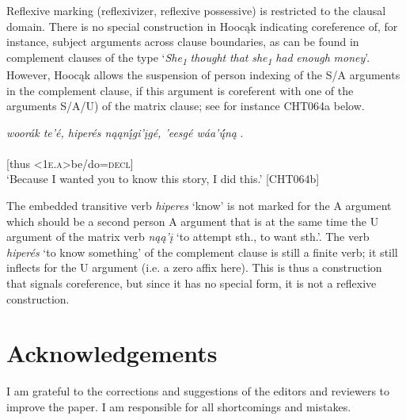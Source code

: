 \documentclass[output=paper]{langscibook}
\begin{document}
Reflexive marking (reflexivizer, reflexive possessive) is restricted to the clausal domain. There is no special construction in Hoocąk indicating coreference of, for instance, subject arguments across clause boundaries, as can be found in complement clauses of the type `\textit{She\textsubscript{1}} \textit{thought} \textit{that} \textit{she\textsubscript{1}} \textit{had} \textit{enough} \textit{money}{}'. However, Hoocąk allows the suspension of person indexing of the S/A arguments in the complement clause, if this argument is coreferent with one of the arguments S/A/U) of the matrix clause; see for instance CHT064a below. 

\ea  \textit{woorák te'é, hiperés nąąn\'{į}gi'įgé, 'eesgé wáa'\'{ų́}ną}  .\\
 \gll  [{woorák} {te'é}  {\textbf{hiperés}}  {\textbf{nąą<nįį-gi>'į=ge}}]   [{'eesgé} {wa<ha>'ųų=ną}]\\
  [{story}  {this}  {\textbf{know}} {\textbf{<1\&}\textbf{\textsc{2-appl.ben}>want=\textsc{causal}}}]   [{thus}  {<\textsc{1e.a}>be/do=\textsc{decl}}]\\
  \glt `Because I wanted you to know this story, I did this.' [CHT064b]
\z 

The embedded transitive verb \textit{hiperes} `know' is not marked for the A argument which should be a second person A argument that is at the same time the U argument of the matrix verb \textit{nąą'į} `to attempt sth., to want sth.'. The verb \textit{hiperés} `to know something' of the complement clause is still a finite verb; it still inflects for the U argument (i.e. a zero affix here). This is thus a construction that signals coreference, but since it has no special form, it is not a reflexive construction.

\section*{Acknowledgements}

I am grateful to the corrections and suggestions of the editors and reviewers to improve the paper. I am responsible for all shortcomings and mistakes.   
\end{document}
